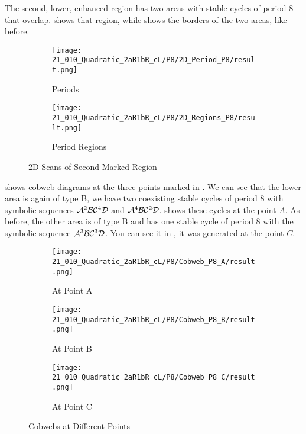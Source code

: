 The second, lower, enhanced region has two areas with stable cycles of period 8 that overlap.
 shows that region, while  shows the borders of the two areas, like before.

\begin{figure}
    \centering
    \begin{subfigure}{0.4\textwidth}
        \centering
        \texttt{[image: 21\_010\_Quadratic\_2aR1bR\_cL/P8/2D\_Period\_P8/result.png]}
        \caption{Periods}
        \label{fig:quadratic.full.2aR1bR_cL.2d.2}
    \end{subfigure}
    \begin{subfigure}{0.4\textwidth}
        \centering
        \texttt{[image: 21\_010\_Quadratic\_2aR1bR\_cL/P8/2D\_Regions\_P8/result.png]}
        \caption{Period Regions}
        \label{fig:quadratic.regions.2aR1bR_cL.2d.2}
    \end{subfigure}
    \caption{2D Scans of Second Marked Region}
\end{figure}

 shows cobweb diagrams at the three points marked in .
We can see that the lower area is again of type B, we have two coexisting stable cycles of period 8 with symbolic sequences $\mathcal{A}^2\mathcal{B}\mathcal{C}^4\mathcal{D}$ and $\mathcal{A}^4\mathcal{B}\mathcal{C}^2\mathcal{D}$.
 shows these cycles at the point $A$.
As before, the other area is of type B and has one stable cycle of period 8 with the symbolic sequence $\mathcal{A}^3\mathcal{B}\mathcal{C}^3\mathcal{D}$.
You can see it in , it was generated at the point $C$.

\begin{figure}
    \centering
    \begin{subfigure}{0.3\textwidth}
        \centering
        \texttt{[image: 21\_010\_Quadratic\_2aR1bR\_cL/P8/Cobweb\_P8\_A/result.png]}
        \caption{At Point A}
        \label{fig:quad.full.2aR1bR_cL.2.CobwebA}
    \end{subfigure}
    \begin{subfigure}{0.3\textwidth}
        \centering
        \texttt{[image: 21\_010\_Quadratic\_2aR1bR\_cL/P8/Cobweb\_P8\_B/result.png]}
        \caption{At Point B}
        \label{fig:quad.full.2aR1bR_cL.2.CobwebB}
    \end{subfigure}
    \begin{subfigure}{0.3\textwidth}
        \centering
        \texttt{[image: 21\_010\_Quadratic\_2aR1bR\_cL/P8/Cobweb\_P8\_C/result.png]}
        \caption{At Point C}
        \label{fig:quad.full.2aR1bR_cL.2.CobwebC}
    \end{subfigure}
    \caption{Cobwebs at Different Points}
    \label{fig:quad.full.2aR1bR_cL.2.Cobwebs}
\end{figure}
